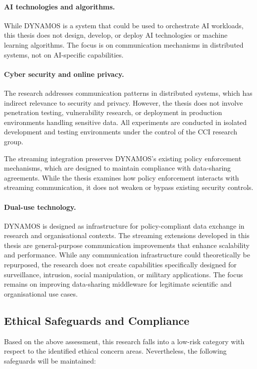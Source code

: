 \documentclass[a4paper,10pt,british]{scrartcl}
\begin{document}
\paragraph{AI technologies and algorithms.}
While DYNAMOS is a system that could be used to orchestrate AI workloads, this thesis does not design, develop, or deploy AI technologies or machine learning algorithms. The focus is on communication mechanisms in distributed systems, not on AI-specific capabilities.

\paragraph{Cyber security and online privacy.}
The research addresses communication patterns in distributed systems, which has indirect relevance to security and privacy. However, the thesis does not involve penetration testing, vulnerability research, or deployment in production environments handling sensitive data. All experiments are conducted in isolated development and testing environments under the control of the CCI research group.

The streaming integration preserves DYNAMOS's existing policy enforcement mechanisms, which are designed to maintain compliance with data-sharing agreements. While the thesis examines how policy enforcement interacts with streaming communication, it does not weaken or bypass existing security controls.

\paragraph{Dual-use technology.}
DYNAMOS is designed as infrastructure for policy-compliant data exchange in research and organisational contexts. The streaming extensions developed in this thesis are general-purpose communication improvements that enhance scalability and performance. While any communication infrastructure could theoretically be repurposed, the research does not create capabilities specifically designed for surveillance, intrusion, social manipulation, or military applications. The focus remains on improving data-sharing middleware for legitimate scientific and organisational use cases.

\subsection{Ethical Safeguards and Compliance}

Based on the above assessment, this research falls into a low-risk category with respect to the identified ethical concern areas. Nevertheless, the following safeguards will be maintained:
\end{document}
